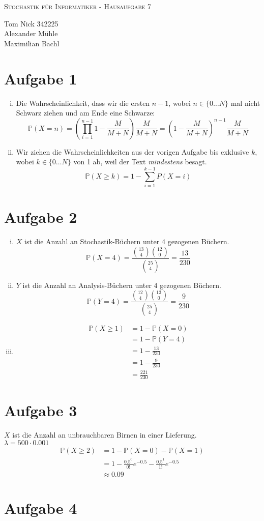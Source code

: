 \documentclass[10pt,a4paper,parskip=half]{scrartcl}
\begin{document}
\begin{center}
\textsc{\Large{Stochastik für Informatiker - Hausaufgabe 7}} \\
\end{center}
\begin{tabbing}
Tom Nick \hspace{1.4cm}\= 342225\\
Alexander Mühle\\
Maximilian Bachl
\end{tabbing}
\section*{Aufgabe 1}
\begin{enumerate}[(i)]
\item
Die Wahrscheinlichkeit, dass wir die ersten $n-1$, wobei $n \in \{0\dots N\}$ mal nicht Schwarz ziehen und am Ende eine Schwarze:
$$\mathbb P(X = n) = \left(\prod_{i=1}^{n-1} 1-\frac{M}{M+N}\right) \frac{M}{M+N} = \left(1- \frac{M}{M+N}\right)^{n-1}\frac{M}{M+N}$$
\item
Wir ziehen die Wahrscheinlichkeiten aus der vorigen Aufgabe bis exklusive $k$, wobei $k \in \{0\dots N\}$ von 1 ab, weil der Text \textit{mindestens} besagt.
$$ \mathbb P(X \ge k) = 1 - \sum_{i=1}^{k-1} P(X = i)$$
\end{enumerate}
\section*{Aufgabe 2}
\begin{enumerate}[(i)]
\item
$X$ ist die Anzahl an Stochastik-Büchern unter 4 gezogenen Büchern.
$$\mathbb P(X=4) = \frac{{13\choose 4} {12 \choose 0}}{{25 \choose 4}} = \frac{13}{230}$$
\item
$Y$ ist die Anzahl an Analysis-Büchern unter 4 gezogenen Büchern.
$$\mathbb P(Y=4) = \frac{{12\choose 4} {13 \choose 0}}{{25 \choose 4}} = \frac{9}{230}$$
\item
\begin{align*}
\mathbb P(X\ge 1) &= 1 - \mathbb P(X= 0)\\
&= 1 - \mathbb P(Y= 4)\\
&= 1 - \frac{13}{230}\\
&= 1 - \frac 9 {230}\\
&= \frac{221}{230}
\end{align*}
\end{enumerate}
\section*{Aufgabe 3}
$X$ ist die Anzahl an unbrauchbaren Birnen in einer Lieferung.\\
$\lambda = 500 \cdot 0.001$
\begin{align*}
\mathbb P(X \ge 2) &= 1 - \mathbb P(X = 0) - \mathbb P(X = 1)\\
&= 1 - \frac{0.5^0}{0!}e^{-0.5} - \frac{0.5^1}{1!}e^{-0.5}\\
& \approx 0.09
\end{align*}
\section*{Aufgabe 4}
\end{document}
